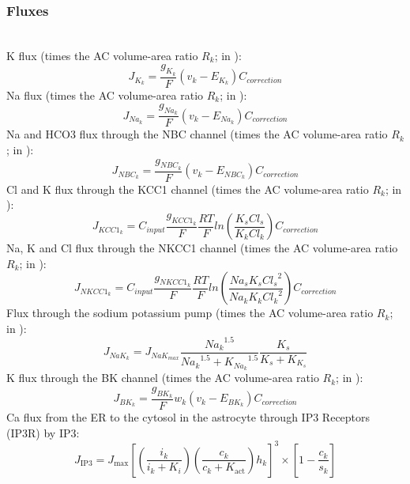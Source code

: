 \subsubsection{Fluxes}~\\
%
\gls{K} flux (times the AC volume-area ratio $R_k$; in \uMmps): 
\begin{equation} \label{eq:J_K}
J_{K_k}=\frac{g_{K_{k}}}{F}(v_k - E_{K_k}) C_{correction}
\end{equation}
%
\gls{Na} flux (times the AC volume-area ratio $R_k$; in \uMmps):
\begin{equation} \label{eq:J_Na}
J_{Na_k}=\frac{g_{Na_{k}}}{F}(v_k - E_{Na_k}) C_{correction}
\end{equation}
%
\gls{Na} and \gls{HCO3} flux through the NBC channel  (times the AC volume-area ratio $R_k$; in \uMmps): 
\begin{equation} \label{eq:J_NBC}
J_{NBC_k}=\frac{g_{NBC_k}}{F}\left(  v_k -E_{NBC_k}  \right) C_{correction}
\end{equation}
%
\gls{Cl} and \gls{K} flux through the KCC1 channel  (times the AC volume-area ratio $R_k$; in \uMmps): 
\begin{equation} \label{eq:J_KCC1}
J_{KCC1_k}=C_{input}\frac{g_{KCC1_k}}{F}\frac{RT}{F}ln \left(\frac{K_s Cl_s }{K_k Cl_k}\right) C_{correction}
\end{equation}
%
\gls{Na}, \gls{K} and \gls{Cl} flux through the NKCC1 channel   (times the AC volume-area ratio $R_k$; in \uMmps): 
\begin{equation} \label{eq:J_NKCC1}
J_{NKCC1_k}=C_{input}\frac{g_{NKCC1_k}}{F}\frac{RT}{F}ln \left(\frac{Na_s K_s {Cl_s}^2}{Na_k K_k {Cl_k}^2}\right) C_{correction}
\end{equation}
%
Flux through the sodium potassium pump   (times the \gls{AC} volume-area ratio $R_k$; in \uMmps): 
\begin{equation} \label{eq:J_NaK_s}
J_{NaK_{k}}=J_{NaK_{max}}\frac{{Na_k}^{1.5}}{{Na_k}^{1.5}+{K_{Na_k}}^{1.5}}\frac{K_s}{K_s+K_{K_s}}
\end{equation}
%
\gls{K} flux through the BK channel  (times the \gls{AC} volume-area ratio $R_k$; in \uMmps): 
\begin{equation} \label{eq:J_BK}
J_{BK_k}=\frac{g_{BK_k}}{F}w_k\left( v_k-E_{BK_k} \right) C_{correction}
\end{equation}
%
\gls{Ca} flux from the ER to the cytosol in the astrocyte through \gls{IP3} Receptors (\gls{IP3}R) by \gls{IP3}: 
\begin{equation} \label{eq:J_ip3}
J_{\mathrm{IP3}}=J_{\mathrm{max}}[(\frac{i_k}{i_k+K_i})(\frac{c_k}{c_k+K_{\mathrm{act}}})h_k]^3\times [1-\frac{c_k}{s_k}] 
\end{equation}
